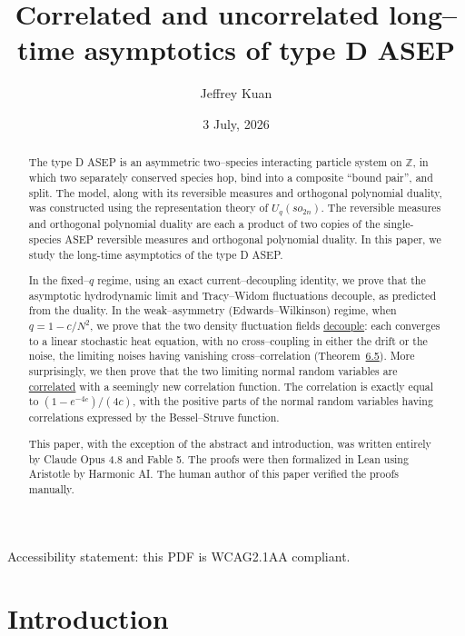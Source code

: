 \documentclass[11pt]{article}
\title{\bf Correlated and uncorrelated long--time asymptotics of type D ASEP}
\author{Jeffrey Kuan}
\date{3 July, 2026}
\theoremstyle{plain}
\theoremstyle{definition}
\theoremstyle{remark}
\newcommand{\Z}{\mathbb{Z}}\newcommand{\R}{\mathbb{R}}\newcommand{\N}{\mathbb{N}}
\begin{document}
Accessibility statement: this PDF is WCAG2.1AA compliant.

\maketitle

\begin{abstract}
The type D ASEP is an asymmetric  two--species interacting particle system on $\Z$, in which two separately conserved species hop, bind into a composite ``bound pair'', and split. The model, along with its reversible measures and orthogonal polynomial duality, was constructed using the representation theory of $U_q(so_{2n})$. The reversible measures and orthogonal polynomial duality are each a product of two copies of the single-species ASEP reversible measures and orthogonal polynomial duality. In this paper, we study the long-time asymptotics of the type D ASEP. 

In the fixed--$q$ regime, using an exact current--decoupling identity, we prove that the asymptotic hydrodynamic limit and Tracy--Widom fluctuations decouple, as predicted from the duality. In the weak--asymmetry (Edwards--Wilkinson) regime, when $q=1-c/N^2$, we prove
that the two density fluctuation fields \underline{decouple}: each converges to a linear
stochastic heat equation, with no cross--coupling in either the drift or the noise,
the limiting noises having vanishing cross--correlation (Theorem~\hyperref[thm_ewmain]{6.5}).
More surprisingly, we then prove that the two limiting normal random variables are \underline{correlated} with a seemingly new correlation function. The correlation is exactly equal to $(1-e^{-4c})/(4c)$, with the positive parts of the normal random variables having correlations expressed by the Bessel--Struve function. 

This paper, with the exception of the abstract and introduction, was written entirely by Claude Opus 4.8 and Fable 5. The proofs were then formalized in Lean using Aristotle by Harmonic AI. The human author of this paper verified the proofs manually.

\end{abstract}



{\small\tableofcontents}

\section{Introduction}\label{sec_intro}
\end{document}
